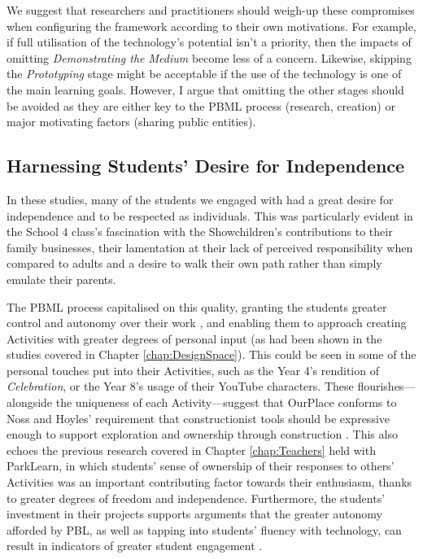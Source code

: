 We suggest that researchers and practitioners should weigh-up these compromises when configuring the framework according to their own motivations. For example, if full utilisation of the technology's potential isn't a priority, then the impacts of omitting \textit{Demonstrating the Medium} become less of a concern. Likewise, skipping the \textit{Prototyping} stage might be acceptable if the use of the technology is one of the main learning goals. However, I argue that omitting the other stages should be avoided as they are either key to the PBML process (research, creation) or major motivating factors (sharing public entities).

\subsection{Harnessing Students' Desire for Independence}
In these studies, many of the students we engaged with had a great desire for independence and to be respected as individuals. This was particularly evident in the School 4 class's fascination with the Showchildren's contributions to their family businesses, their lamentation at their lack of perceived responsibility when compared to adults and a desire to walk their own path rather than simply emulate their parents.

The PBML process capitalised on this quality, granting the students greater control and autonomy over their work \citep{Noss2017, Wurdinger2007}, and enabling them to approach creating Activities with greater degrees of personal input (as had been shown in the studies covered in Chapter \ref{chap:DesignSpace}). This could be seen in some of the personal touches put into their Activities, such as the Year 4's rendition of \textit{Celebration}, or the Year 8's usage of their YouTube characters. These flourishes---alongside the uniqueness of each Activity---suggest that OurPlace conforms to Noss and Hoyles' requirement that constructionist tools should be expressive enough to support exploration and ownership through construction \citep{Noss2017}. This also echoes the previous research covered in Chapter \ref{chap:Teachers} held with ParkLearn, in which students' sense of ownership of their responses to others' Activities was an important contributing factor towards their enthusiasm, thanks to greater degrees of freedom and independence. Furthermore, the students' investment in their projects supports arguments that the greater autonomy afforded by PBL, as well as tapping into students' fluency with technology, can result in indicators of greater student engagement \citep{Wurdinger2007, Bell2010}.

